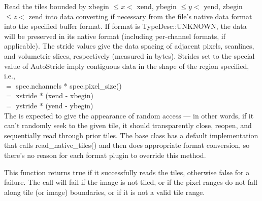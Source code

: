 Read the tiles bounded by {\kw xbegin} $\le x <$ {\kw xend},
{\kw ybegin} $\le y <$ {\kw yend}, {\kw zbegin} $\le z <$ {\kw zend}
into {\kw data}
converting if necessary from the file's native data format into
the specified buffer {\kw format}.
If {\cf format} is {\cf TypeDesc::UNKNOWN}, the data will be preserved 
in its native format (including per-channel formats, if applicable).
The stride values
give the data spacing of adjacent pixels, scanlines, and volumetric
slices, respectively (measured in bytes).  Strides set to the special
value of {\kw AutoStride} imply contiguous data in the shape of
the region specified, i.e., \\
 $=$ {\kw spec.nchannels * spec.pixel_size()} \\
 $=$ {\kw xstride * (xend - xbegin)} \\
 $=$ {\kw ystride * (yend - ybegin)} \\
The \ImageInput is expected to give the appearance of random access
--- in other words, if it can't randomly seek to the given tile, it
should transparently close, reopen, and sequentially read through prior
tiles.  The base \ImageInput class has a default implementation
that calls {\cf read_native_tiles()} and then does appropriate format conversion,
so there's no reason for each format plugin to override this method.

This function returns {\cf true} if it successfully reads the tiles,
otherwise {\cf false} for a failure.
The call will fail if the image is not tiled, or if the pixel ranges
do not fall along tile (or image) boundaries, or if it is not a valid
tile range.


